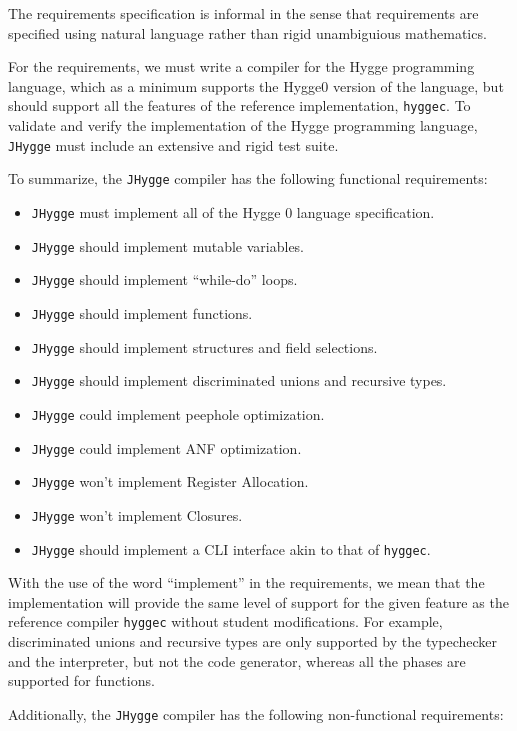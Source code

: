 The requirements specification is informal in the sense that requirements are specified using natural language rather than rigid unambiguious mathematics.

For the requirements, we must write a compiler for the Hygge programming language, which as a minimum supports the Hygge0 version of the language,
but should support all the features of the reference implementation, \texttt{hyggec}.
To validate and verify the implementation of the Hygge programming language, \texttt{JHygge} must include an extensive and rigid test suite.

To summarize, the \texttt{JHygge} compiler has the following functional requirements:

\begin{itemize}
  \item \texttt{JHygge} must implement all of the Hygge 0 language specification.
  \item \texttt{JHygge} should implement mutable variables.
  \item \texttt{JHygge} should implement ``while-do'' loops.
  \item \texttt{JHygge} should implement functions.
  \item \texttt{JHygge} should implement structures and field selections.
  \item \texttt{JHygge} should implement discriminated unions and recursive types.
  \item \texttt{JHygge} could implement peephole optimization.
  \item \texttt{JHygge} could implement ANF optimization.
  \item \texttt{JHygge} won't implement Register Allocation.
  \item \texttt{JHygge} won't implement Closures.
  \item \texttt{JHygge} should implement a CLI interface akin to that of \texttt{hyggec}.
\end{itemize}

With the use of the word ``implement'' in the requirements, we mean that the implementation will provide the same level of support
for the given feature as the reference compiler \texttt{hyggec} without student modifications. For example, discriminated unions
and recursive types are only supported by the typechecker and the interpreter, but not the code generator, whereas all the phases
are supported for functions.

Additionally, the \texttt{JHygge} compiler has the following non-functional requirements:

